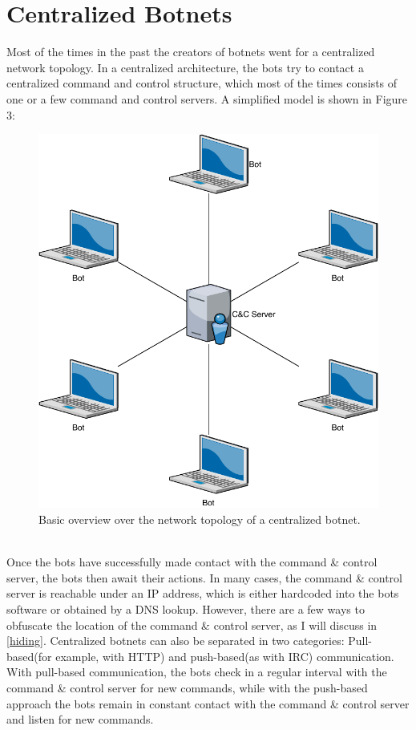\documentclass[10pt, a4paper, twocolumn]{article} %
\begin{document}
\section{Centralized Botnets}
Most of the times in the past the creators of botnets went for a centralized network topology. In a centralized architecture, the bots try to contact a centralized command and control structure, which most of the times consists of one or a few command and control servers. A simplified model is shown in Figure 3:
\begin{figure}[ht]
  \centering
  \includegraphics[width=\linewidth]{figures/central}
  \caption{Basic overview over the network topology of a centralized botnet.}
\end{figure} \\

Once the bots have successfully made contact with the command \& control server, the bots then await their actions. In many cases, the command \& control server is reachable under an IP address, which is either hardcoded into the bots software or obtained by a DNS lookup. However, there are a few ways to obfuscate the location of the command \& control server, as I will discuss in \autoref{hiding}. 
Centralized botnets can also be separated in two categories: Pull-based(for example, with HTTP) and push-based(as with IRC) communication. With pull-based communication, the bots check in a regular interval with the command \& control server for new commands, while with the push-based approach the bots remain in constant contact with the command \& control server and listen for new commands. 
\end{document}
